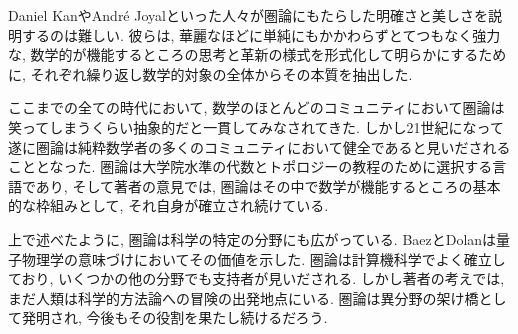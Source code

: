 
Daniel KanやAndr\'{e} Joyalといった人々が圏論にもたらした明確さと美しさを説明するのは難しい. 彼らは, 華麗なほどに単純にもかかわらずとてつもなく強力な, 数学的が機能するところの思考と革新の様式を形式化して明らかにするために, それぞれ繰り返し数学的対象の全体からその本質を抽出した.


ここまでの全ての時代において, 数学のほとんどのコミュニティにおいて圏論は笑ってしまうくらい抽象的だと一貫してみなされてきた. しかし21世紀になって遂に圏論は純粋数学者の多くのコミュニティにおいて健全であると見いだされることとなった. 圏論は大学院水準の代数とトポロジーの教程のために選択する言語であり, そして著者の意見では, 圏論はその中で数学が機能するところの基本的な枠組みとして, それ自身が確立され続けている. 


上で述べたように, 圏論は科学の特定の分野にも広がっている. BaezとDolanは量子物理学の意味づけにおいてその価値を示した. 圏論は計算機科学でよく確立しており, いくつかの他の分野でも支持者が見いだされる. しかし著者の考えでは, まだ人類は科学的方法論への冒険の出発地点にいる. 圏論は異分野の架け橋として発明され, 今後もその役割を果たし続けるだろう.


